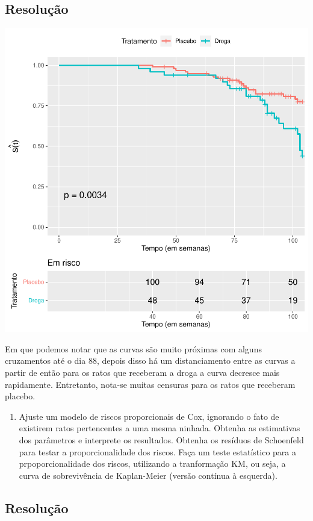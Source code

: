 \documentclass[]{article}
\providecommand{\tightlist}{%
  \setlength{\itemsep}{0pt}\setlength{\parskip}{0pt}}
\begin{document}
\subsection{Resolução}\label{resolucao-3}

\begin{center}\includegraphics[width=0.8\linewidth]{Lista_5_files/figure-latex/unnamed-chunk-11-1} \end{center}

Em que podemos notar que as curvas são muito próximas com alguns
cruzamentos até o dia 88, depois disso há um distanciamento entre as
curvas a partir de então para os ratos que receberam a droga a curva
decresce mais rapidamente. Entretanto, nota-se muitas censuras para os
ratos que receberam placebo.

\begin{enumerate}
\def\labelenumi{(\alph{enumi})}
\setcounter{enumi}{1}
\tightlist
\item
  Ajuste um modelo de riscos proporcionais de Cox, ignorando o fato de
  existirem ratos pertencentes a uma mesma ninhada. Obtenha as
  estimativas dos parâmetros e interprete os resultados. Obtenha os
  resíduos de Schoenfeld para testar a proporcionalidade dos riscos.
  Faça um teste estatístico para a prpoporcionalidade dos riscos,
  utilizando a tranformação KM, ou seja, a curva de sobrevivência de
  Kaplan-Meier (versão contínua à esquerda).
\end{enumerate}

\subsection{Resolução}\label{resolucao-4}
\end{document}
